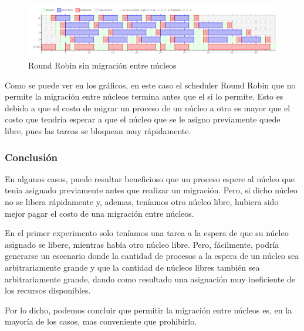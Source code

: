 \begin{figure}[H]
\begin{center}
\includegraphics[width=1.1\textwidth]{img/ej8-2-RR2.png}
     \caption{Round Robin sin migración entre núcleos}
\end{center}
\end{figure}

Como se puede ver en los gráficos, en este caso el scheduler Round Robin que no permite la migración entre núcleos termina antes que el si lo permite. Esto es debido a que el costo de migrar un proceso de un núcleo a otro es mayor que el costo que tendría esperar a que el núcleo que se le asigno previamente quede libre, pues las tareas se bloquean muy rápidamente.

\subsubsection{Conclusión}

En algunos casos, puede resultar beneficioso que un proceso espere al núcleo que tenia asignado previamente antes que realizar un migración. Pero, si dicho núcleo no se libera rápidamente y, ademas, teníamos otro núcleo libre, hubiera sido mejor pagar el costo de una migración entre núcleos.

En el primer experimento solo teníamos una tarea a la espera de que su núcleo asignado se libere, mientras había otro núcleo libre. Pero, fácilmente, podría generarse un escenario donde la cantidad de procesos a la espera de un núcleo sea arbitrariamente grande y que la cantidad de núcleos libres también sea arbitrariamente grande, dando como resultado una asignación muy ineficiente de los recursos disponibles.

Por lo dicho, podemos concluir que permitir la migración entre núcleos es, en la mayoría de los casos, mas conveniente que prohibirlo.
